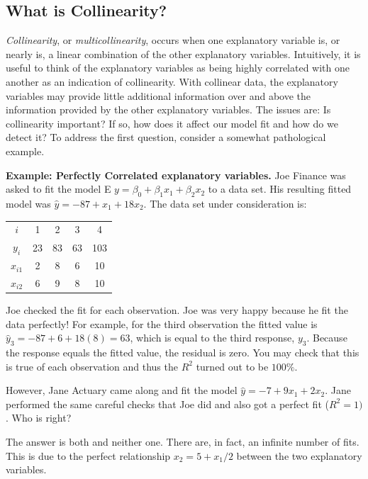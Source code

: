 \subsection{What is Collinearity?}

\textit{Collinearity}, or \textit{multicollinearity}, occurs when
one explanatory variable is, or nearly is, a linear combination of
the other explanatory variables. Intuitively, it is useful to think
of the explanatory variables as being highly correlated with one
another as an indication of collinearity. With collinear data, the
explanatory variables may provide little additional information over
and above the information provided by the other explanatory
variables. The issues are: Is collinearity important? If so, how
does it affect our model fit and how do we detect it? To address the
first question, consider a somewhat pathological example.

\linejed

\textbf{Example: Perfectly Correlated explanatory variables.} Joe
Finance was asked to fit the model E
$y=\beta_0+\beta_1x_1+\beta_2x_2$ to a data set. His resulting
fitted model was $\hat{y}=-87+x_1+18x_2.$  The data set under
consideration is:

\begin{center}
\begin{tabular}{ccccc}
\hline
$i$ & 1 & 2 & 3 & 4 \\
$y_i$ & 23 & 83 & 63 & 103 \\
$x_{i1}$ & 2 & 8 & 6 & 10 \\
$x_{i2}$ & 6 & 9 & 8 & 10 \\ \hline
\end{tabular}%
\end{center}

Joe checked the fit for each observation. Joe was very happy because
he fit the data perfectly! For example, for the third observation
the fitted value is $\hat{y}_3=-87+6+18(8)=63$, which is equal to
the third response, $y_3 $. Because the response equals the fitted
value, the residual is zero. You may check that this is true of each
observation and thus the $R^2$ turned out to be $100\%$.

However, Jane Actuary came along and fit the model
$\hat{y}=-7+9x_1+2x_2.$ Jane performed the same careful checks that
Joe did and also got a perfect fit ($R^2 = 1)$. Who is right?

The answer is both and neither one. There are, in fact, an infinite
number of fits. This is due to the perfect relationship
$x_2=5+x_1/2$ between the two explanatory variables.

